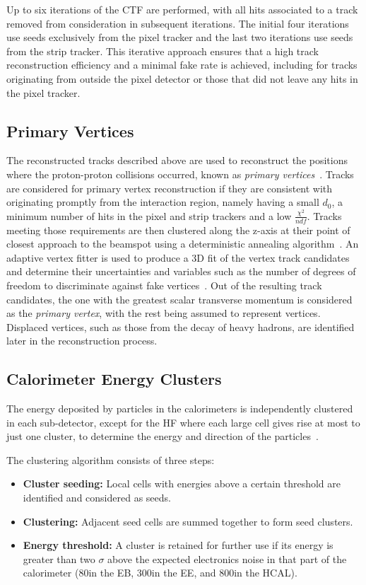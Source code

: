 Up to six iterations of the CTF are performed, with all hits associated to a track removed from consideration in subsequent iterations.
The initial four iterations use seeds exclusively from the pixel tracker and the last two iterations use seeds from the strip tracker.
This iterative approach ensures that a high track reconstruction efficiency and a minimal fake rate is achieved, including for tracks originating from outside the pixel detector or those that did not leave any hits in the pixel tracker.

\subsection{Primary Vertices}\label{subsec:vertices}
The reconstructed tracks described above are used to reconstruct the positions where the proton-proton collisions occurred, known as \emph{primary vertices}~\cite{Chatrchyan:2014fea,Speer:2006mh}.
Tracks are considered for primary vertex reconstruction if they are consistent with originating promptly from the interaction region, namely having a small $d_{0}$, a minimum number of hits in the pixel and strip trackers and a low $\frac{\chi^{2}}{ndf}$.
Tracks meeting those requirements are then clustered along the z-axis at their point of closest approach to the beamspot using a deterministic annealing algorithm~\cite{Kenneth:1998i}.
An adaptive vertex fitter is used to produce a 3D fit of the vertex track candidates and determine their uncertainties and variables such as the number of degrees of freedom to discriminate against fake vertices~\cite{Fruhwirth:2007hz}.
Out of the resulting track candidates, the one with the greatest scalar transverse momentum is considered as the \emph{primary vertex}, with the rest being assumed to represent \PU vertices.
Displaced vertices, such as those from the decay of heavy hadrons, are identified later in the reconstruction process.

\subsection{Calorimeter Energy Clusters}\label{subsec:clustering}
The energy deposited by particles in the calorimeters is independently clustered in each sub-detector, except for the HF where each large cell gives rise at most to just one cluster, to determine the energy and direction of the particles~\cite{CMS:2009nxa}.

The clustering algorithm consists of three steps:
\begin{itemize}
\item \textbf{Cluster seeding:} Local cells with energies above a certain threshold are identified and considered as seeds.
\item \textbf{Clustering:} Adjacent seed cells are summed together to form seed clusters.
\item \textbf{Energy threshold:} A cluster is retained for further use if its energy is greater than two $\sigma$ above the expected electronics noise in that part of the calorimeter (80\MeV in the EB, 300\MeV in the EE, and 800\MeV in the HCAL).
\end{itemize}

